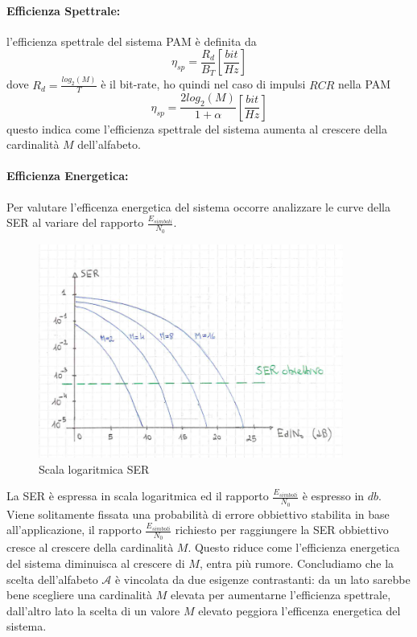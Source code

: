             \paragraph{Efficienza Spettrale: }\label{Efficenza Spettrale} l'efficienza spettrale del sistema PAM è definita da 
                \[
                    \eta_{sp} = \frac{R_d}{B_T} [\frac{bit}{Hz}]    
                \]
                dove $R_d=\frac{log_2(M)}{T}$ è il bit-rate, ho quindi nel caso di impulsi $RCR$ 
                nella PAM
                \[
                    \eta_{sp} = \frac{2log_2(M)}{1+\alpha} [\frac{bit}{Hz}]    
                \]
                questo indica come l'efficienza spettrale del sistema aumenta al crescere della cardinalità $M$
                dell'alfabeto. 
            \paragraph{Efficienza Energetica: }\label{Efficenza Energetica}
                Per valutare l'efficenza energetica del sistema occorre analizzare le curve della SER 
                al variare del rapporto $\frac{E_{simboli}}{N_0}$.
                \begin{figure}[H]
                    \centering
                    \includegraphics[width = 10cm]{media/scala_logaritmica_ser.png}
                    \caption{Scala logaritmica SER}
                \end{figure}
                La SER è espressa in scala logaritmica ed il rapporto $\frac{E_{simboli}}{N_0}$ è espresso in $db$.
                Viene solitamente fissata una probabilità di errore obbiettivo stabilita in base all'applicazione, il
                rapporto $\frac{E_{simboli}}{N_0}$ richiesto per raggiungere la SER obbiettivo cresce al crescere della 
                cardinalità $M$. Questo riduce come l'efficienza energetica del sistema diminuisca al crescere di $M$, entra più rumore.
                Concludiamo che la scelta dell'alfabeto $\mathcal{A}$ è vincolata da due esigenze contrastanti:
                da un lato sarebbe bene scegliere una cardinalità $M$ elevata per aumentarne l'efficienza spettrale, dall'altro
                lato la scelta di un valore $M$ elevato peggiora l'efficenza energetica del sistema.

